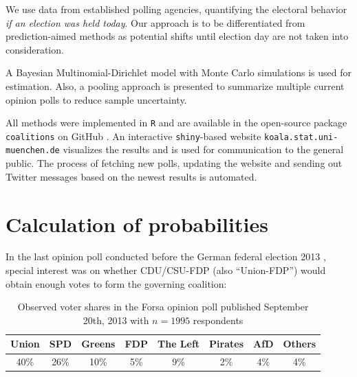 \documentclass[smallcondensed]{svjour3}     %
\begin{document}
We use data from
established polling agencies,
quantifying the electoral behavior \textit{if an election was held today}.
Our approach is to be differentiated from prediction-aimed methods \citep[cf.][]{graefe_2017, norpoth_gschwend_2010} as potential shifts until election day are not taken into consideration.

A Bayesian Multinomial-Dirichlet model with Monte Carlo simulations is used for estimation. Also, a pooling approach is presented to summarize multiple current opinion polls to reduce sample uncertainty.

All methods were implemented in \texttt{R} and are available in the open-source
package \texttt{coalitions} on GitHub \citep{bender_bauer_2018}. An
interactive \texttt{shiny}-based \citep{chang_2017} website \texttt{koala.stat.uni-\allowbreak muenchen.\allowbreak de}
visualizes the results and is used for communication to the general public.
The process of fetching new polls, updating the website and sending out Twitter messages based on the newest results is automated.



\section{Calculation of probabilities} \label{sec:method}
In the last opinion poll conducted before the German federal election 2013 \citep{forsa_2013}, special interest was on whether CDU/CSU-FDP (also ``Union-FDP'') would obtain enough votes to form the governing coalition:

\begin{table}[!ht]\centering
\caption{Observed voter shares in the Forsa opinion poll published September 20th, 2013 with $n=1995$ respondents
\label{bauer:tab_fdp}
}
\medskip
\begin{tabular}{cccccccc}
\toprule[0.09 em]
Union & SPD & Greens & FDP & The Left & Pirates & AfD & Others \\
\midrule
40\% & 26\% & 10\% & 5\% & 9\% & 2\% & 4\% & 4\% \\
\bottomrule[0.09 em]
\end{tabular}
\end{table}
\end{document}
